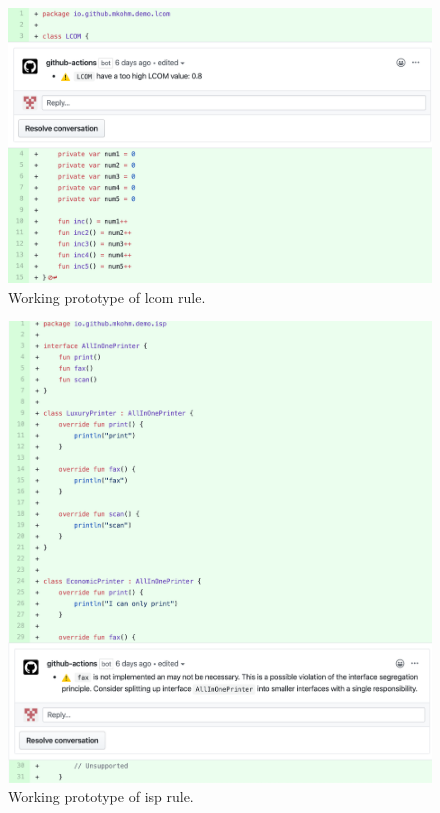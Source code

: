 \begin{figure}[h!]
    \centering
    \includegraphics[width=\textwidth]{images/final_lcom.png}
    \caption{Working prototype of \gls{lcom} rule.}
\end{figure}

\begin{figure}[h!]
    \centering
    \includegraphics[width=\textwidth]{images/final_isp.png}
    \caption{Working prototype of \gls{isp} rule.}
\end{figure}

